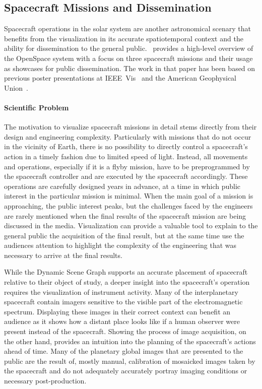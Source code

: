 \subsection{Spacecraft Missions and Dissemination} \label{contributions:astro:sc}
Spacecraft operations in the solar system are another astronomical scenary that benefits from the visualization in its accurate spatiotemporal context and the ability for dissemination to the general public.  \paperOS\ provides a high-level overview of the OpenSpace system with a focus on three spacecraft missions and their usage as showcases for public dissemination.  The work in that paper has been based on previous poster presentations at IEEE~Vis~\cite{bock15openspace} and the American Geophysical Union~\cite{bock15bopenspace}.

\paragraph{Scientific Problem} \label{contributions:astro:gb:problem}
The motivation to visualize spacecraft missions in detail stems directly from their design and engineering complexity.  Particularly with missions that do not occur in the vicinity of Earth, there is no possibility to directly control a spacecraft's action in a timely fashion due to limited speed of light.  Instead, all movements and operations, especially if it is a flyby mission, have to be preprogrammed by the spacecraft controller and are executed by the spacecraft accordingly.  These operations are carefully designed years in advance, at a time in which public interest in the particular mission is minimal.  When the main goal of a mission is approaching, the public interest peaks, but the challenges faced by the engineers are rarely mentioned when the final results of the spacecraft mission are being discussed in the media.  Visualization can provide a valuable tool to explain to the general public the acquisition of the final result, but at the same time use the audiences attention to highlight the complexity of the engineering that was necessary to arrive at the final results.

While the Dynamic Scene Graph supports an accurate placement of spacecraft relative to their object of study, a deeper insight into the spacecraft's operation requires the visualization of instrument activity.  Many of the interplanetary spacecraft contain imagers sensitive to the visible part of the electromagnetic spectrum.  Displaying these images in their correct context can benefit an audience as it shows how a distant place looks like if a human observer were present instead of the spacecraft.  Showing the process of image acquisition, on the other hand, provides an intuition into the planning of the spacecraft's actions ahead of time.  Many of the planetary global images that are presented to the public are the result of, mostly manual, calibration of mosaicked images taken by the spacecraft and do not adequately accurately portray imaging conditions or necessary post-production.

